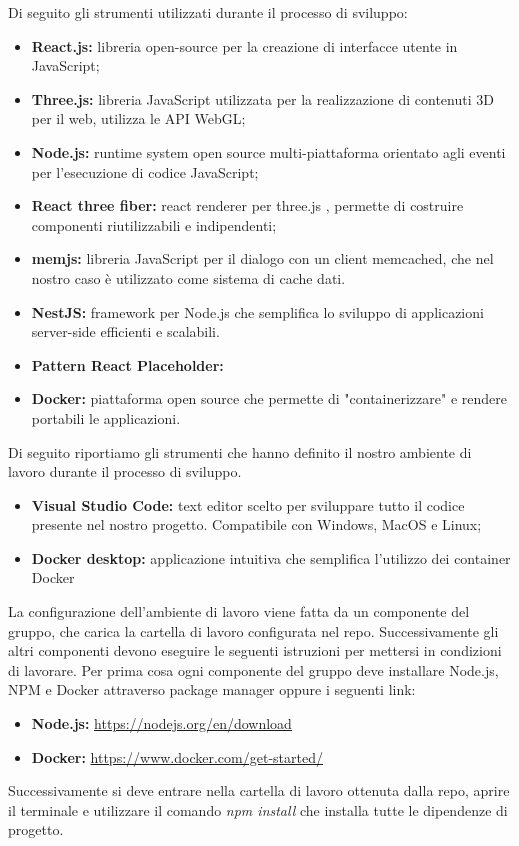 Di seguito gli strumenti utilizzati durante il processo di sviluppo:
\begin{itemize}
    \item \textbf{React.js:} libreria open-source per la creazione di interfacce utente in JavaScript;
    \item \textbf{Three.js:} libreria JavaScript utilizzata per la realizzazione di contenuti 3D per il web, utilizza le
    API WebGL;
    \item \textbf{Node.js:} runtime system open source multi-piattaforma orientato agli eventi per l’esecuzione
    di codice JavaScript;
    \item \textbf{React three fiber:} react renderer per three.js , permette di costruire componenti riutilizzabili
    e indipendenti;
    \item \textbf{memjs:} libreria JavaScript per il dialogo con un client memcached, che nel nostro caso è utilizzato come sistema di cache dati.
    \item \textbf{NestJS:} framework per Node.js che semplifica lo sviluppo di applicazioni server-side efficienti e scalabili.
    \item \textbf{Pattern React Placeholder:}
    \item \textbf{Docker:} piattaforma open source che permette di "containerizzare" e rendere portabili le applicazioni.
\end{itemize}

Di seguito riportiamo gli strumenti che hanno definito il nostro ambiente di lavoro durante il processo di
sviluppo.

\begin{itemize}
    \item \textbf{Visual Studio Code:} text editor scelto per sviluppare tutto il codice presente nel nostro progetto.
    Compatibile con Windows, MacOS e Linux;
    \item \textbf{Docker desktop:} applicazione intuitiva che semplifica l'utilizzo dei container Docker 
\end{itemize}

La configurazione dell’ambiente di lavoro viene fatta da un componente del gruppo, che carica la cartella
di lavoro configurata nel repo. Successivamente gli altri componenti devono eseguire le seguenti istruzioni
per mettersi in condizioni di lavorare. Per prima cosa ogni componente del gruppo deve installare Node.js, NPM e Docker
attraverso package manager oppure i seguenti link:
\begin{itemize}
    \item \textbf{Node.js:} \url{https://nodejs.org/en/download}
    \item \textbf{Docker:} \url{https://www.docker.com/get-started/}
\end{itemize}
Successivamente si deve entrare nella cartella di lavoro ottenuta dalla repo, aprire il terminale e utilizzare
il comando \textit{npm install} che installa tutte le dipendenze di progetto.

